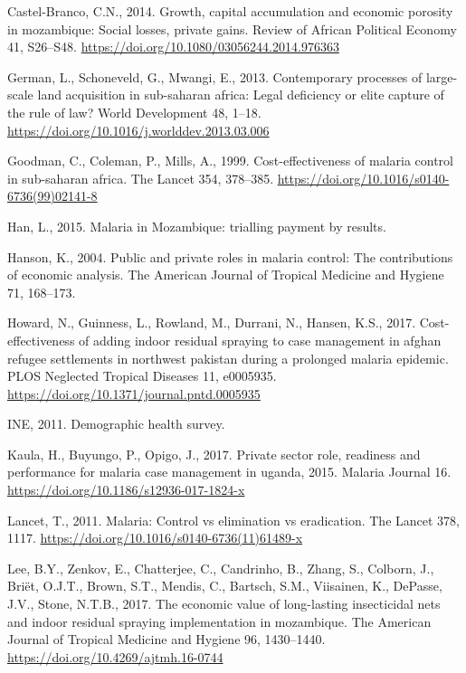\documentclass[]{article}
\begin{document}
\hypertarget{ref-CastelBranco2014}{}
Castel-Branco, C.N., 2014. Growth, capital accumulation and economic
porosity in mozambique: Social losses, private gains. Review of African
Political Economy 41, S26--S48.
\url{https://doi.org/10.1080/03056244.2014.976363}

\hypertarget{ref-German2013}{}
German, L., Schoneveld, G., Mwangi, E., 2013. Contemporary processes of
large-scale land acquisition in sub-saharan africa: Legal deficiency or
elite capture of the rule of law? World Development 48, 1--18.
\url{https://doi.org/10.1016/j.worlddev.2013.03.006}

\hypertarget{ref-Goodman1999}{}
Goodman, C., Coleman, P., Mills, A., 1999. Cost-effectiveness of malaria
control in sub-saharan africa. The Lancet 354, 378--385.
\url{https://doi.org/10.1016/s0140-6736(99)02141-8}

\hypertarget{ref-Han}{}
Han, L., 2015. Malaria in Mozambique: trialling payment by results.

\hypertarget{ref-Hanson2004}{}
Hanson, K., 2004. Public and private roles in malaria control: The
contributions of economic analysis. The American Journal of Tropical
Medicine and Hygiene 71, 168--173.

\hypertarget{ref-Howard_2017}{}
Howard, N., Guinness, L., Rowland, M., Durrani, N., Hansen, K.S., 2017.
Cost-effectiveness of adding indoor residual spraying to case management
in afghan refugee settlements in northwest pakistan during a prolonged
malaria epidemic. PLOS Neglected Tropical Diseases 11, e0005935.
\url{https://doi.org/10.1371/journal.pntd.0005935}

\hypertarget{ref-estatistica2009}{}
INE, 2011. Demographic health survey.

\hypertarget{ref-Kaula_2017}{}
Kaula, H., Buyungo, P., Opigo, J., 2017. Private sector role, readiness
and performance for malaria case management in uganda, 2015. Malaria
Journal 16. \url{https://doi.org/10.1186/s12936-017-1824-x}

\hypertarget{ref-TheLancet2011}{}
Lancet, T., 2011. Malaria: Control vs elimination vs eradication. The
Lancet 378, 1117. \url{https://doi.org/10.1016/s0140-6736(11)61489-x}

\hypertarget{ref-Lee2017}{}
Lee, B.Y., Zenkov, E., Chatterjee, C., Candrinho, B., Zhang, S.,
Colborn, J., Briët, O.J.T., Brown, S.T., Mendis, C., Bartsch, S.M.,
Viisainen, K., DePasse, J.V., Stone, N.T.B., 2017. The economic value of
long-lasting insecticidal nets and indoor residual spraying
implementation in mozambique. The American Journal of Tropical Medicine
and Hygiene 96, 1430--1440. \url{https://doi.org/10.4269/ajtmh.16-0744}
\end{document}
